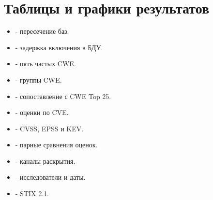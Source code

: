 \documentclass[12pt,a4paper]{report}
\begin{document}
\section*{Таблицы и графики результатов}
\begin{itemize}
\item \href{https://github.com/quiner1793/HSE-Cybersecurity-Programming-Work1/blob/master/data/analysis/1_sources/intersections.png}{} - пересечение баз.
\item \href{https://github.com/quiner1793/HSE-Cybersecurity-Programming-Work1/blob/master/data/analysis/1_sources/bdu_lag.csv}{} - задержка включения в БДУ.
\item \href{https://github.com/quiner1793/HSE-Cybersecurity-Programming-Work1/blob/master/data/analysis/2_cwe/top_cwe.png}{} - пять частых CWE.
\item \href{https://github.com/quiner1793/HSE-Cybersecurity-Programming-Work1/blob/master/data/analysis/2_cwe/cwe_groups.png}{} - группы CWE.
\item \href{https://github.com/quiner1793/HSE-Cybersecurity-Programming-Work1/blob/master/data/analysis/2_cwe/top25_comparison.csv}{} - сопоставление с CWE Top 25.
\item \href{https://github.com/quiner1793/HSE-Cybersecurity-Programming-Work1/blob/master/data/analysis/3_cvss/cvss_by_cve.png}{} - оценки по CVE.
\item \href{https://github.com/quiner1793/HSE-Cybersecurity-Programming-Work1/blob/master/data/analysis/3_cvss/cvss_epss.png}{} - CVSS, EPSS и KEV.
\item \href{https://github.com/quiner1793/HSE-Cybersecurity-Programming-Work1/blob/master/data/analysis/3_cvss/comparisons.csv}{} - парные сравнения оценок.
\item \href{https://github.com/quiner1793/HSE-Cybersecurity-Programming-Work1/blob/master/data/analysis/4_disclosure/channels.png}{} - каналы раскрытия.
\item \href{https://github.com/quiner1793/HSE-Cybersecurity-Programming-Work1/blob/master/data/analysis/4_disclosure/disclosure_by_cve.csv}{} - исследователи и даты.
\item \href{https://github.com/quiner1793/HSE-Cybersecurity-Programming-Work1/blob/master/data/analysis/5_cve_2026_24747/cve-2026-24747.stix.json}{} - STIX 2.1.
\end{itemize}
\end{document}
